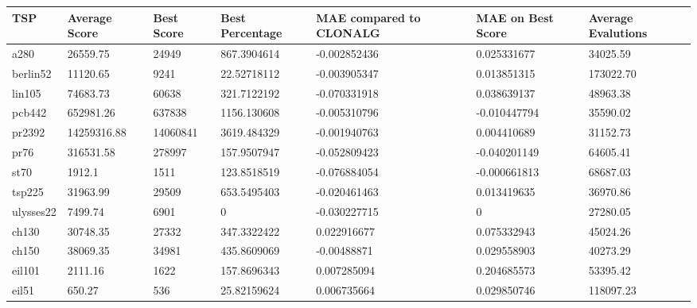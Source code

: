 \begin{table}[H]
	\begin{tabular}{|l|p{2cm}|p{1.6cm}|p{2.2cm}|p{2.4cm}|p{2.4cm}|p{1.7cm}|}
		\hline
		TSP       & Average Score & Best Score & Best Percentage &\textbf{ MAE compared to CLONALG} & MAE on Best Score & Average Evalutions \\ \hline
		a280      & 26559.75      & 24949      & 867.3904614     & -0.002852436            & 0.025331677       & 34025.59           \\ \hline
		berlin52  & 11120.65      & 9241       & 22.52718112     & -0.003905347            & 0.013851315       & 173022.70          \\ \hline
		lin105    & 74683.73      & 60638      & 321.7122192     & -0.070331918            & 0.038639137       & 48963.38           \\ \hline
		pcb442    & 652981.26     & 637838     & 1156.130608     & -0.005310796            & -0.010447794      & 35590.02           \\ \hline
		pr2392    & 14259316.88   & 14060841   & 3619.484329     & -0.001940763            & 0.004410689       & 31152.73           \\ \hline
		pr76      & 316531.58     & 278997     & 157.9507947     & -0.052809423            & -0.040201149      & 64605.41           \\ \hline
		st70      & 1912.1        & 1511       & 123.8518519     & -0.076884054            & -0.000661813      & 68687.03           \\ \hline
		tsp225    & 31963.99      & 29509      & 653.5495403     & -0.020461463            & 0.013419635       & 36970.86           \\ \hline
		ulysses22 & 7499.74       & 6901       & 0               & -0.030227715            & 0                 & 27280.05           \\ \hline
		ch130     & 30748.35      & 27332      & 347.3322422     & 0.022916677             & 0.075332943       & 45024.26           \\ \hline
		ch150     & 38069.35      & 34981      & 435.8609069     & -0.00488871             & 0.029558903       & 40273.29           \\ \hline
		eil101    & 2111.16       & 1622       & 157.8696343     & 0.007285094             & 0.204685573       & 53395.42           \\ \hline
		eil51     & 650.27        & 536        & 25.82159624     & 0.006735664             & 0.029850746       & 118097.23          \\ \hline

\end{tabular}
\end{table}
